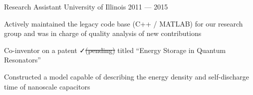 \begin{cventries}
  \cventry%
  {Research Assistant} %
  {University of Illinois}
  {\color{awesome}{Center for Complex Systems Research}} %
  {2011 --- 2015}
  {
  \begin{cvitems}%
    \item{Actively maintained the legacy code base (C++ / MATLAB) for our
      research group and was in charge of quality analysis of new
      contributions}
    \item{Co-inventor on a patent \faCheck \sout{(pending)} titled ``Energy Storage in Quantum
        Resonators''}
    \item{Constructed a model capable of describing the energy density and
      self-discharge time of nanoscale capacitors}
  \end{cvitems}%
  }

\end{cventries}
